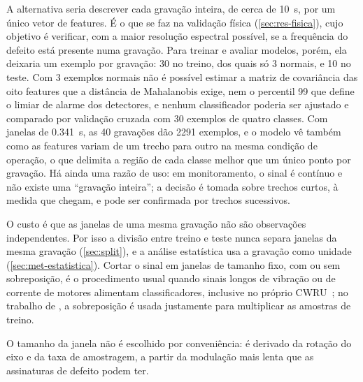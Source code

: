 A alternativa seria descrever cada gravação inteira, de cerca de \SI{10}{\second},
por um único vetor de features. É o que se faz na validação física
(\autoref{sec:res-fisica}), cujo objetivo é verificar, com a maior resolução
espectral possível, se a frequência do defeito está presente numa gravação. Para
treinar e avaliar modelos, porém, ela deixaria um exemplo por gravação: 30 no
treino, dos quais só 3 normais, e 10 no teste. Com 3 exemplos normais não é
possível estimar a matriz de covariância das oito features que a distância de
Mahalanobis exige, nem o percentil 99 que define o limiar de alarme dos
detectores, e nenhum classificador poderia ser ajustado e comparado por
validação cruzada com 30 exemplos de quatro classes. Com janelas de
\SI{0.341}{\second}, as 40 gravações dão \num{2291} exemplos, e o modelo vê
também como as features variam de um trecho para outro na mesma condição de
operação, o que delimita a região de cada classe melhor que um único ponto por
gravação. Há ainda uma razão de uso: em monitoramento, o sinal é contínuo e não
existe uma ``gravação inteira''; a decisão é tomada sobre trechos curtos, à medida
que chegam, e pode ser confirmada por trechos sucessivos.

O custo é que as janelas de uma mesma gravação não são observações
independentes. Por isso a divisão entre treino e teste nunca separa janelas da
mesma gravação (\autoref{sec:split}), e a análise estatística usa a gravação como
unidade (\autoref{sec:met-estatistica}). Cortar o sinal em janelas de tamanho fixo, com ou sem
sobreposição, é o procedimento usual quando sinais longos de vibração ou de
corrente de motores alimentam classificadores, inclusive no próprio
CWRU~\cite{zhang2017}; no
trabalho de \textcite{zhang2017}, a sobreposição é usada justamente para
multiplicar as amostras de treino.

O tamanho da janela não é escolhido por conveniência: é derivado da
rotação do eixo e da taxa de amostragem, a partir da modulação mais lenta que as
assinaturas de defeito podem ter.

